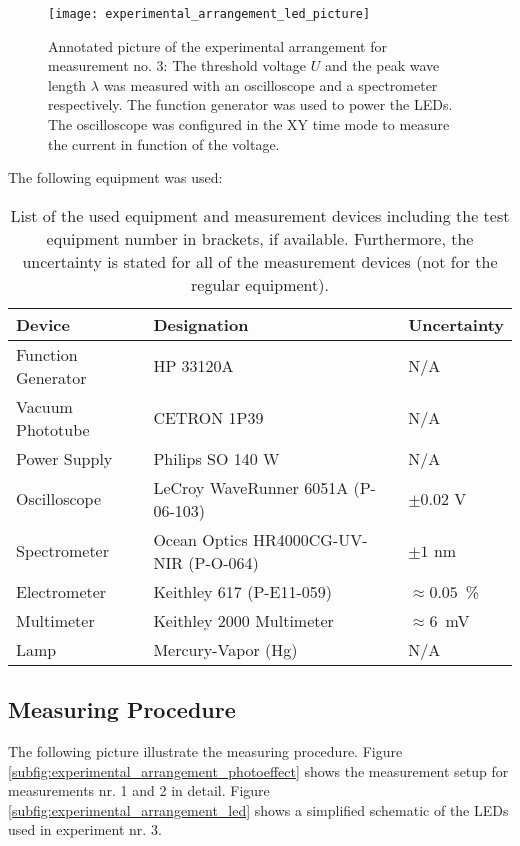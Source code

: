 \begin{figure}[H]
	\centering
	\texttt{[image: experimental\_arrangement\_led\_picture]}
	\caption{Annotated picture of the experimental arrangement for measurement no. 3: The threshold voltage $U$ and the peak wave length $\lambda$ was measured with an oscilloscope and a spectrometer respectively. The function generator was used to power the LEDs. The oscilloscope was configured in the XY time mode to measure the current in function of the voltage.}
	\label{fig:experimental_arrangement_led_picture}
\end{figure}

The following equipment was used:

\begin{table}[H]
	\centering
	\renewcommand{\arraystretch}{1.2}
	\begin{tabular}{l l l}
		\hline
		\textbf{Device} & \textbf{Designation} & \textbf{Uncertainty} \\
		\hline
		Function Generator & HP 33120A & N/A \\
		Vacuum Phototube & CETRON 1P39 & N/A \\
		Power Supply & Philips SO 140 W & N/A \\
		Oscilloscope & LeCroy WaveRunner 6051A (P-06-103) \cite{oscilloscope} & $\pm0.02$ V \\
		Spectrometer & Ocean Optics HR4000CG-UV-NIR (P-O-064) \cite{spectrometer} & $\pm1$ nm \\
		Electrometer & Keithley 617 (P-E11-059) \cite{electrometer} & $\approx0.05$\ \% \\
		Multimeter & Keithley 2000 Multimeter \cite{multimeter} & $\approx6$\ mV \\
		Lamp & Mercury-Vapor (Hg) & N/A \\ \hline
	\end{tabular}
	\caption{List of the used equipment and measurement devices including the test equipment number in brackets, if available. Furthermore, the uncertainty is stated for all of the measurement devices (not for the regular equipment).}
	\label{tab:equipment}
\end{table}

\newpage
\subsection{Measuring Procedure}
\label{subsec:measuring_procedure}
The following picture illustrate the measuring procedure. Figure \ref{subfig:experimental_arrangement_photoeffect} shows the measurement setup for measurements nr. 1 and 2 in detail. Figure \ref{subfig:experimental_arrangement_led} shows a simplified schematic of the LEDs used in experiment nr. 3.

